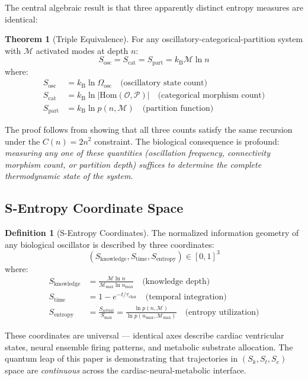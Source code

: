\documentclass[10pt,twocolumn,a4paper]{article}
\theoremstyle{definition}
\newtheorem{theorem}{Theorem}
\newtheorem{definition}{Definition}
\newcommand{\SE}{S_{\text{entropy}}}
\newcommand{\SK}{S_{\text{knowledge}}}
\newcommand{\ST}{S_{\text{time}}}
\newcommand{\Sosc}{S_{\text{osc}}}
\newcommand{\Scat}{S_{\text{cat}}}
\newcommand{\Spart}{S_{\text{part}}}
\newcommand{\kB}{k_{\text{B}}}
\newcommand{\calO}{\mathcal{O}}
\newcommand{\calP}{\mathcal{P}}
\begin{document}
The central algebraic result is that three apparently distinct entropy measures
are identical:

\begin{theorem}[Triple Equivalence]
\label{thm:triple}
For any oscillatory-categorical-partition system with $\mathcal{M}$ activated modes
at depth $n$:
\begin{equation}
\boxed{\Sosc = \Scat = \Spart = \kB \mathcal{M} \ln n}
\end{equation}
where:
\begin{align}
\Sosc &= \kB \ln \Omega_{\text{osc}} \quad \text{(oscillatory state count)}\\
\Scat &= \kB \ln |\text{Hom}(\calO, \calP)| \quad \text{(categorical morphism count)}\\
\Spart &= \kB \ln p(n, \mathcal{M}) \quad \text{(partition function)}
\end{align}
\end{theorem}

The proof follows from showing that all three counts satisfy the same recursion
under the $C(n) = 2n^2$ constraint. The biological consequence is profound:
\emph{measuring any one of these quantities (oscillation frequency, connectivity
morphism count, or partition depth) suffices to determine the complete thermodynamic
state of the system.}

\subsection{S-Entropy Coordinate Space}

\begin{definition}[S-Entropy Coordinates]
The normalized information geometry of any biological oscillator is described
by three coordinates:
\begin{equation}
(\SK, \ST, \SE) \in [0,1]^3
\end{equation}
where:
\begin{align}
\SK &= \frac{\mathcal{M} \ln n}{\mathcal{M}_{\max} \ln n_{\max}} \quad \text{(knowledge depth)}\\
\ST &= 1 - e^{-t/\tau_{\text{char}}} \quad \text{(temporal integration)}\\
\SE &= \frac{S_{\text{actual}}}{S_{\max}} = \frac{\ln p(n, \mathcal{M})}{\ln p(n_{\max}, \mathcal{M}_{\max})} \quad \text{(entropy utilization)}
\end{align}
\end{definition}

These coordinates are universal — identical axes describe cardiac ventricular
states, neural ensemble firing patterns, and metabolic substrate allocation.
The quantum leap of this paper is demonstrating that trajectories in
$(S_k, S_t, S_e)$ space are \emph{continuous} across the cardiac-neural-metabolic
interface.
\end{document}
